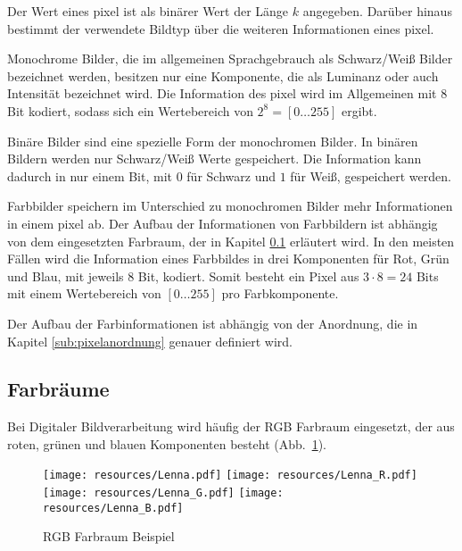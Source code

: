 Der Wert eines \gls{pixel} ist als binärer Wert der Länge $k$ angegeben. Darüber hinaus bestimmt der verwendete Bildtyp über die weiteren Informationen eines \gls{pixel}.

Monochrome Bilder, die im allgemeinen Sprachgebrauch als Schwarz/Weiß Bilder bezeichnet werden, besitzen nur eine Komponente, die als Luminanz oder auch Intensität bezeichnet wird. Die Information des \gls{pixel} wird im Allgemeinen mit 8 Bit kodiert, sodass sich ein Wertebereich von $2^8 = \left[0\dotsc255\right]$ ergibt.

Binäre Bilder sind eine spezielle Form der monochromen Bilder. In binären Bildern werden nur Schwarz/Weiß Werte gespeichert. Die Information kann dadurch in nur einem Bit, mit $0$ für Schwarz und $1$ für Weiß, gespeichert werden.

Farbbilder speichern im Unterschied zu monochromen Bilder mehr Informationen in einem \gls{pixel} ab. Der Aufbau der Informationen von Farbbildern ist abhängig von dem eingesetzten Farbraum, der in Kapitel \ref{sub:farbräume} erläutert wird. In den meisten Fällen wird die Information eines Farbbildes in drei Komponenten für Rot, Grün und Blau, mit jeweils 8 Bit, kodiert. Somit besteht ein Pixel aus \(3 \cdot 8 = 24\) Bits mit einem Wertebereich von \(\left[0 \dotsc 255\right]\) pro Farbkomponente.

Der Aufbau der Farbinformationen ist abhängig von der Anordnung, die in Kapitel \ref{sub:pixelanordnung} genauer definiert wird.


\subsection{Farbräume} %
\label{sub:farbräume}

Bei Digitaler Bildverarbeitung wird häufig der RGB Farbraum eingesetzt, der aus roten, grünen und blauen Komponenten besteht (Abb.~\ref{fig:rgbLenna}).

\begin{figure}[!ht]
	\centering
	\texttt{[image: resources/Lenna.pdf]}
	\texttt{[image: resources/Lenna\_R.pdf]}
	\texttt{[image: resources/Lenna\_G.pdf]}
	\texttt{[image: resources/Lenna\_B.pdf]}
	\caption{RGB Farbraum Beispiel}
	\label{fig:rgbLenna}
\end{figure}

